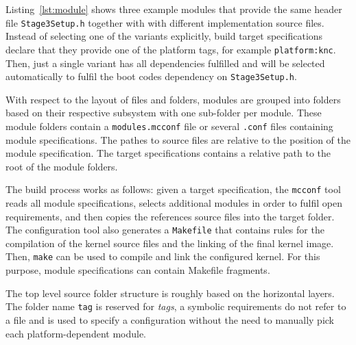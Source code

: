 Listing~\ref{lst:module} shows three example modules that provide the same header file \texttt{Stage3Setup.h} together with with different implementation source files. Instead of selecting one of the variants explicitly, build target specifications declare that they provide one of the platform tags, for example \texttt{platform:knc}. Then, just a single variant has all dependencies fulfilled and will be selected automatically to fulfil the boot codes dependency on \texttt{Stage3Setup.h}.

With respect to the layout of files and folders, modules are grouped into folders based on their respective subsystem with one sub-folder per module. These module folders contain a \texttt{modules.mcconf} file or several \texttt{.conf} files containing module specifications. The pathes to source files are relative to the position of the module specification. The target specifications contains a relative path to the root of the module folders.

The build process works as follows: given a target specification, the \texttt{mcconf} tool reads all module specifications, selects additional modules in order to fulfil open requirements, and then copies the references source files into the target folder. The configuration tool also generates a \texttt{Makefile} that contains rules for the compilation of the kernel source files and the linking of the final kernel image. Then, \texttt{make} can be used to compile and link the configured kernel. For this purpose, module specifications can contain Makefile fragments.


The top level source folder structure is roughly based on the horizontal layers. The folder name \texttt{tag} is reserved for \emph{tags}, a symbolic requirements do not refer to a file and is used to specify a configuration without the need to manually pick each platform-dependent module.

